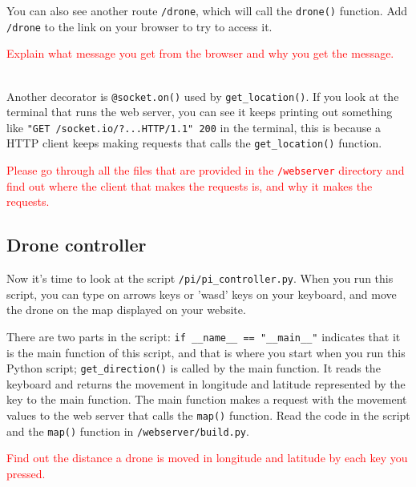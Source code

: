 \documentclass{article}
\begin{document}
You can also see another route \texttt{/drone}, which will call the \texttt{drone()} function. Add \texttt{/drone} to the link on your browser to try to access it.\\

\parbox[t]{14cm}{\textcolor{red}{Explain what message you get from the browser and why you get the message.}}\\


Another decorator is \texttt{@socket.on()} used by \texttt{get\_location()}. If you look at the terminal that runs the web server, you can see it keeps printing out something like \texttt{"GET /socket.io/?...HTTP/1.1" 200} in the terminal, this is because a HTTP client keeps making requests that calls the \texttt{get\_location()} function.\\

\parbox[t]{14cm}{\textcolor{red}{Please go through all the files that are provided in the \texttt{/webserver} directory and find out where the client that makes the requests is, and why it makes the requests.}}


\subsection{Drone controller}
Now it's time to look at the script \texttt{/pi/pi\_controller.py}. When you run this script, you can type on arrows keys or 'wasd' keys on your keyboard, and move the drone on the map displayed on your website.

There are two parts in the script: \texttt{if \_\_name\_\_ == "\_\_main\_\_"} indicates that it is the main function of this script, and that is where you start when you run this Python script; \texttt{get\_direction()} is called by the main function. It reads the keyboard and returns the movement in longitude and latitude represented by the key to the main function. The main function makes a request with the movement values to the web server that calls the \texttt{map()} function. Read the code in the script and the \texttt{map()} function in \texttt{/webserver/build.py}.\\

\parbox[t]{14cm}{\textcolor{red}{Find out the distance a drone is moved in longitude and latitude by each key you pressed.}}
\end{document}

